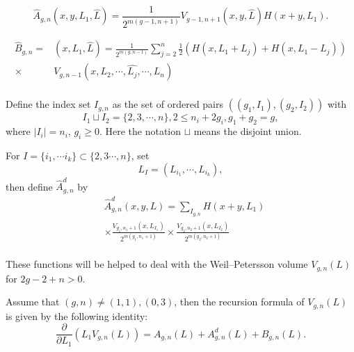 \begin{definition}[ $\hat{A}_{g,n}$]
$$
\hat{A}_{g,n}(x,y,L_1,\hat{L})=\frac{1}{2^{m(g-1,n+1)}}V_{g-1,n+1}(x,y,\hat{L})H(x+y,L_1).
$$
\end{definition}

\begin{definition}[$\hat{B}_{g,n}$]
$$
\begin{aligned}
\hat{B}_{g,n}=&(x,L_1,\hat{L})=\frac{1}{2^{m(g,n-1)}}\sum_{j=2}^n\frac{1}{2}(H(x,L_1+L_j)+H(x,L_1-L_j))\\
\times & V_{g,n-1}(x,L_2,\cdots,\hat{L_j},\cdots,L_n)\\
\end{aligned}
$$
\end{definition}

\begin{definition}[$\hat{A}_{g,n}^{d}$]
Define the index set  $I_{g,n}$ as the set of ordered  pairs 
$((g_1,I_1),(g_2,I_2))$ with $$I_1\sqcup I_2=\{2,3,\cdots,n\}, 2\leq n_i+2g_i,g_1+g_2=g,$$
where $|I_i|=n_i$, $g_i\geq 0$. Here the notation $\sqcup$ means the disjoint union.

For $I=\{i_1,\cdots i_k\}\subset \{2,3\cdots,n\}$,  set $$
L_I=(L_{i_1},\cdots,L_{i_k}),
$$
then define $\hat{A}_{g,n}^{d}$ by 
$$
\begin{aligned}
&\hat{A}_{g,n}^{d}(x,y,L)=\sum_{I_{g,n}}H(x+y,L_1)\\
&\times \frac{V_{g_1,n_1+1}(x,L_{I_1})}{2^{m(g_1,n_1+1)}}\times  \frac{V_{g_2,n_2+1}(x,L_{I_2})}{2^{m(g_2,n_2+1)}}\\
\end{aligned}
$$


\end{definition}

These functions will be helped to deal with  the Weil--Petersson volume $V_{g,n}(L)$ for $2g-2+n>0$.


\begin{theorem}
Assume that $(g,n)\neq(1,1),(0,3)$, then 
the recursion formula of  $V_{g,n}(L)$ is given by the following identity:
\begin{equation}\label{recursivefor}
    \frac{\partial }{\partial L_1}(L_1V_{g,n}(L))=A_{g,n}(L)+A_{g,n}^{d}(L)+B_{g,n}(L).
\end{equation}
\end{theorem}

